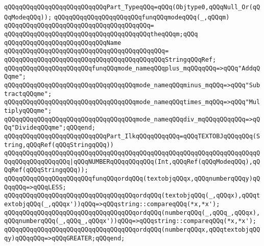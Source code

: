 \newline
\verb|qQQqqQQqqQQqqQQqqQQqqQQqqQQqPart_TypeqQQq=qQQq(Objtype0,qQQqNull_Or(qQQqModeqQQq));|\newline
\newline
\verb|qQQqqQQqqQQqqQQqqQQqqQQqfunqQQqmodeqQQq(_,qQQqm)|\newline
\verb|qQQqqQQqqQQqqQQqqQQqqQQqqQQqqQQqqQQqqQQq=|\newline
\verb|qQQqqQQqqQQqqQQqqQQqqQQqqQQqqQQqqQQqqQQqtheqQQqm;qQQq|\newline
\newline
\verb|qQQqqQQqqQQqqQQqqQQqqQQqqQQqName|\newline
\verb|qQQqqQQqqQQqqQQqqQQqqQQqqQQqqQQqqQQqqQQqqQQq=|\newline
\verb|qQQqqQQqqQQqqQQqqQQqqQQqqQQqqQQqqQQqqQQqqQQqStringqQQqRef;|\newline
\newline
\verb|qQQqqQQqqQQqqQQqqQQqqQQqfunqQQqmode_nameqQQqplus_mqQQqqQQq=>qQQq"AddqQQqme";|\newline
\verb|qQQqqQQqqQQqqQQqqQQqqQQqqQQqqQQqqQQqmode_nameqQQqminus_mqQQq=>qQQq"SubtractqQQqme";|\newline
\verb|qQQqqQQqqQQqqQQqqQQqqQQqqQQqqQQqqQQqmode_nameqQQqtimes_mqQQq=>qQQq"MultiplyqQQqme";|\newline
\verb|qQQqqQQqqQQqqQQqqQQqqQQqqQQqqQQqqQQqmode_nameqQQqdiv_mqQQqqQQqqQQq=>qQQq"DivideqQQqme";qQQqend;|\newline
\newline
\newline
\verb|qQQqqQQqqQQqqQQqqQQqqQQqqQQqPart_IlkqQQqqQQqqQQq=qQQqTEXTOBJqQQqqQQq(String,qQQqRef(qQQqStringqQQq))|\newline
\verb|qQQqqQQqqQQqqQQqqQQqqQQqqQQqqQQqqQQqqQQqqQQqqQQqqQQqqQQqqQQqqQQqqQQqqQQqqQQqqQQqqQQqqQQq|\verb#|qQQqNUMBERqQQqqQQqqQQq(Int,qQQqRef(qQQqModeqQQq),qQQqRef(qQQqStringqQQq));#\newline
\newline
\verb|qQQqqQQqqQQqqQQqqQQqqQQqfunqQQqordqQQq(textobjqQQqx,qQQqnumberqQQqy)qQQqqQQq=>qQQqLESS;|\newline
\verb|qQQqqQQqqQQqqQQqqQQqqQQqqQQqqQQqqQQqordqQQq(textobjqQQq(_,qQQqx),qQQqtextobjqQQq(_,qQQqx'))qQQq=>qQQqstring::compareqQQq(*x,*x');|\newline
\verb|qQQqqQQqqQQqqQQqqQQqqQQqqQQqqQQqqQQqordqQQq(numberqQQq(_,qQQq_,qQQqx),qQQqnumberqQQq(_,qQQq_,qQQqx'))qQQq=>qQQqstring::compareqQQq(*x,*x');|\newline
\verb|qQQqqQQqqQQqqQQqqQQqqQQqqQQqqQQqqQQqordqQQq(numberqQQqx,qQQqtextobjqQQqy)qQQqqQQq=>qQQqGREATER;qQQqend;|\newline
